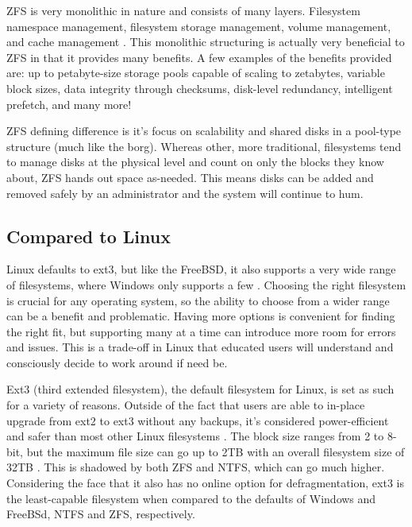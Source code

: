 \documentclass[10pt,draftclsnofoot,onecolumn]{IEEEtran}
\begin{document}
\par ZFS is very monolithic in nature and consists of many layers.
Filesystem namespace management, filesystem storage management, volume management, and cache management \cite{bsd:1}.
This monolithic structuring is actually very beneficial to ZFS in that it provides many benefits.
A few examples of the benefits provided are: up to petabyte-size storage pools capable of scaling to zetabytes, variable block sizes, data integrity through checksums, disk-level redundancy, intelligent prefetch, and many more! \cite{bsd:1}

\par ZFS defining difference is it's focus on scalability and shared disks in a pool-type structure (much like the borg).
Whereas other, more traditional, filesystems tend to manage disks at the physical level and count on only the blocks they know about, ZFS hands out space as-needed.
This means disks can be added and removed safely by an administrator and the system will continue to hum.

\subsection{Compared to Linux}
\label{sub:File Systems Linux}
\par Linux defaults to ext3, but like the FreeBSD, it also supports a very wide range of filesystems, where Windows only supports a few \cite{linux:1}\cite{win:2}.
Choosing the right filesystem is crucial for any operating system, so the ability to choose from a wider range can be a benefit and problematic.
Having more options is convenient for finding the right fit, but supporting many at a time can introduce more room for errors and issues.
This is a trade-off in Linux that educated users will understand and consciously decide to work around if need be.

\par Ext3 (third extended filesystem), the default filesystem for Linux, is set as such for a variety of reasons.
Outside of the fact that users are able to in-place upgrade from ext2 to ext3 without any backups, it's considered power-efficient and safer than most other Linux filesystems \cite{linux:2}.
The block size ranges from 2 to 8-bit, but the maximum file size can go up to 2TB with an overall filesystem size of 32TB \cite{linux:2}.
This is shadowed by both ZFS and NTFS, which can go much higher.
Considering the face that it also has no online option for defragmentation, ext3 is the least-capable filesystem when compared to the defaults of Windows and FreeBSd, NTFS and ZFS, respectively.
\end{document}
